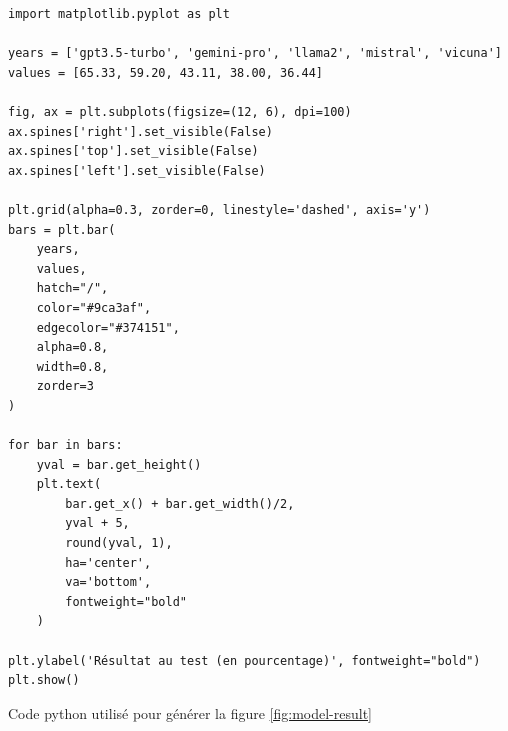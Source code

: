\begin{listing}[!ht]
\begin{verbatim}
import matplotlib.pyplot as plt

years = ['gpt3.5-turbo', 'gemini-pro', 'llama2', 'mistral', 'vicuna']
values = [65.33, 59.20, 43.11, 38.00, 36.44]

fig, ax = plt.subplots(figsize=(12, 6), dpi=100)
ax.spines['right'].set_visible(False)
ax.spines['top'].set_visible(False)
ax.spines['left'].set_visible(False)

plt.grid(alpha=0.3, zorder=0, linestyle='dashed', axis='y')
bars = plt.bar(
    years, 
    values, 
    hatch="/", 
    color="#9ca3af", 
    edgecolor="#374151", 
    alpha=0.8, 
    width=0.8, 
    zorder=3
)

for bar in bars:
    yval = bar.get_height()
    plt.text(
        bar.get_x() + bar.get_width()/2, 
        yval + 5, 
        round(yval, 1), 
        ha='center', 
        va='bottom', 
        fontweight="bold"
    )

plt.ylabel('Résultat au test (en pourcentage)', fontweight="bold")
plt.show()
\end{verbatim}
\caption{Code python utilisé pour générer la figure \ref{fig:model-result}}
\label{appendix:code:python:model-result}
\end{listing}
